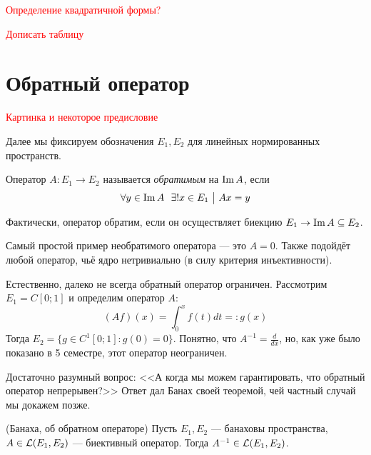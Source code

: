 \textcolor{red}{Определение квадратичной формы?}

\textcolor{red}{Дописать таблицу}

\section{Обратный оператор}

\textcolor{red}{Картинка и некоторое предисловие}

\begin{note}
	Далее мы фиксируем обозначения $E_1, E_2$ для линейных нормированных пространств.
\end{note}

\begin{definition}
	Оператор $A \colon E_1 \to E_2$ называется \textit{обратимым} на $\operatorname{Im} A$, если
	\[
		\forall y \in \im A\ \ \exists ! x \in E_1 \such Ax = y
	\]
\end{definition}

\begin{anote}
	Фактически, оператор обратим, если он осуществляет биекцию $E_1 \to \operatorname{Im} A \subseteq E_2$.
\end{anote}

\begin{example}
	Самый простой пример необратимого оператора --- это $A = 0$. Также подойдёт любой оператор, чьё ядро нетривиально (в силу критерия инъективности).
\end{example}

\begin{example}
	Естественно, далеко не всегда обратный оператор ограничен. Рассмотрим $E_1 = C[0; 1]$ и определим оператор $A$:
	\[
		(Af)(x) = \int_0^x f(t)dt =: g(x)
	\]
	Тогда $E_2 = \{g \in C^1[0; 1] \colon g(0) = 0\}$. Понятно, что $A^{-1} = \frac{d}{dx}$, но, как уже было показано в 5 семестре, этот оператор неограничен.
\end{example}

\begin{note}
	Достаточно разумный вопрос: <<А когда мы можем гарантировать, что обратный оператор непрерывен?>> Ответ дал Банах своей теоремой, чей частный случай мы докажем позже.
\end{note}

\begin{theorem} (Банаха, об обратном операторе)
	Пусть $E_1, E_2$ --- банаховы пространства, $A \in \mathcal{L}(E_1, E_2)$ --- биективный оператор. Тогда $A^{-1} \in \mathcal{L}(E_1, E_2)$.
\end{theorem}